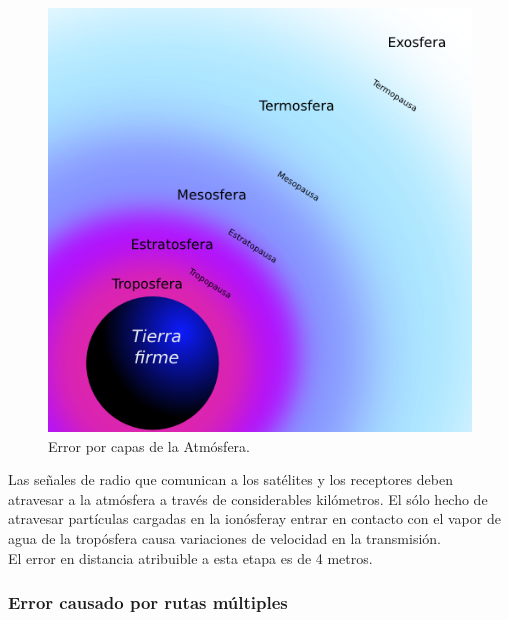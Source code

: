 \begin{figure}[H]
\centering
\includegraphics[scale=0.9]{Figures/CapasAtm}
\caption[Error por capas de la Atmósfera.]{Error por capas de la Atmósfera\footnotemark.}
\label{fig:ErrAtm}
\end{figure}


Las señales de radio que comunican a los satélites y los receptores deben atravesar a la atmósfera a través de considerables kilómetros. El sólo hecho de atravesar partículas cargadas en la ionósfera\footnotemark y entrar en contacto con el vapor de agua de la tropósfera causa variaciones de velocidad en la transmisión. \\

El error en distancia atribuible a esta etapa es de 4 metros. 


\subsubsection{Error causado por rutas múltiples}


